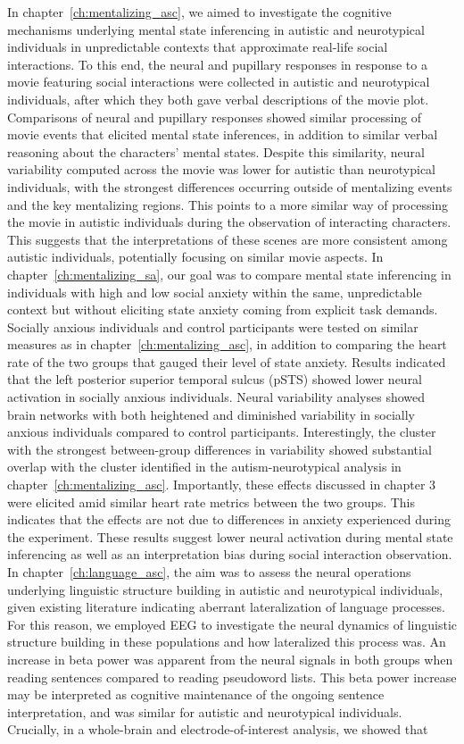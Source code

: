 In chapter~\ref{ch:mentalizing_asc}, we aimed to investigate the cognitive mechanisms underlying mental state inferencing in autistic and neurotypical individuals in unpredictable contexts that approximate real-life social interactions. To this end, the neural and pupillary responses in response to a movie featuring social interactions were collected in autistic and neurotypical individuals, after which they both gave verbal descriptions of the movie plot. Comparisons of neural and pupillary responses showed similar processing of movie events that elicited mental state inferences, in addition to similar verbal reasoning about the characters' mental states. Despite this similarity, neural variability computed across the movie was lower for autistic than neurotypical individuals, with the strongest differences occurring outside of mentalizing events and the key mentalizing regions. This points to a more similar way of processing the movie in autistic individuals during the observation of interacting characters. This suggests that the interpretations of these scenes are more consistent among autistic individuals, potentially focusing on similar movie aspects. In chapter~\ref{ch:mentalizing_sa}, our goal was to compare mental state inferencing in individuals with high and low social anxiety within the same, unpredictable context but without eliciting state anxiety coming from explicit task demands. Socially anxious individuals and control participants were tested on similar measures as in chapter~\ref{ch:mentalizing_asc}, in addition to comparing the heart rate of the two groups that gauged their level of state anxiety. Results indicated that the left posterior superior temporal sulcus (pSTS) showed lower neural activation in socially anxious individuals. Neural variability analyses showed brain networks with both heightened and diminished variability in socially anxious individuals compared to control participants. Interestingly, the cluster with the strongest between-group differences in variability showed substantial overlap with the cluster identified in the autism-neurotypical analysis in chapter~\ref{ch:mentalizing_asc}. Importantly, these effects discussed in chapter 3 were elicited amid similar heart rate metrics between the two groups. This indicates that the effects are not due to differences in anxiety experienced during the experiment. These results suggest lower neural activation during mental state inferencing as well as an interpretation bias during social interaction observation. In chapter~\ref{ch:language_asc}, the aim was to assess the neural operations underlying linguistic structure building in autistic and neurotypical individuals, given existing literature indicating aberrant lateralization of language processes. For this reason, we employed EEG to investigate the neural dynamics of linguistic structure building in these populations and how lateralized this process was. An increase in beta power was apparent from the neural signals in both groups when reading sentences compared to reading pseudoword lists. This beta power increase may be interpreted as cognitive maintenance of the ongoing sentence interpretation, and was similar for autistic and neurotypical individuals. Crucially, in a whole-brain and electrode-of-interest analysis, we showed that 
